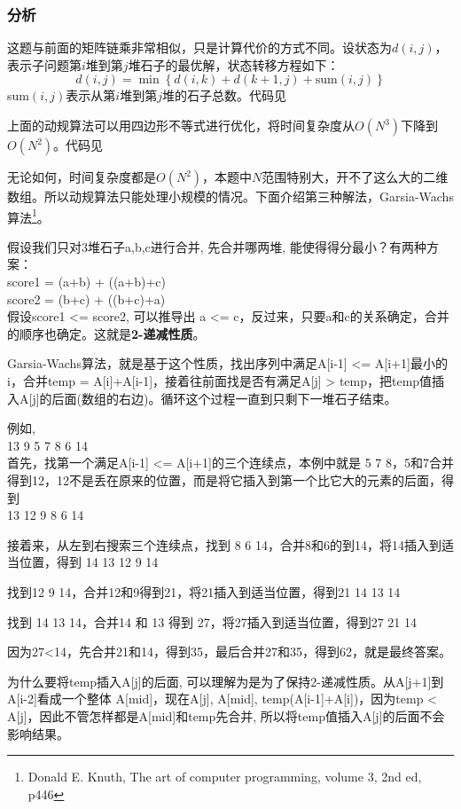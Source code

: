 \subsubsection{分析}
这题与前面的矩阵链乘非常相似，只是计算代价的方式不同。设状态为$d(i,j)$，表示子问题第$i$堆到第$j$堆石子的最优解，状态转移方程如下：
$$d(i,j)=\min\left\{d(i,k)+d(k+1,j) + \text{sum}(i,j)\right\}$$
sum$(i,j)$表示从第$i$堆到第$j$堆的石子总数。代码见

上面的动规算法可以用四边形不等式进行优化，将时间复杂度从$O(N^3)$下降到$O(N^2)$。代码见

无论如何，时间复杂度都是$O(N^2)$，本题中$N$范围特别大，开不了这么大的二维数组。所以动规算法只能处理小规模的情况。下面介绍第三种解法，Garsia-Wachs算法\footnote{Donald E. Knuth, The art of computer programming, volume 3, 2nd ed, p446}。

假设我们只对3堆石子a,b,c进行合并, 先合并哪两堆, 能使得得分最小？有两种方案：\\
score1 = (a+b) + ((a+b)+c)\\
score2 = (b+c) + ((b+c)+a)\\
假设score1 <= score2, 可以推导出 a <= c，反过来，只要a和c的关系确定，合并的顺序也确定。这就是\textbf{2-递减性质}。

Garsia-Wachs算法，就是基于这个性质，找出序列中满足A[i-1] <= A[i+1]最小的i，合并temp = A[i]+A[i-1]，接着往前面找是否有满足A[j] > temp，把temp值插入A[j]的后面(数组的右边)。循环这个过程一直到只剩下一堆石子结束。

例如,\\
13 9 5 7 8 6 14\\
首先，找第一个满足A[i-1] <= A[i+1]的三个连续点，本例中就是 5 7 8，5和7合并得到12，12不是丢在原来的位置，而是将它插入到第一个比它大的元素的后面，得到\\
13 12 9 8 6 14

接着来，从左到右搜索三个连续点，找到 8 6 14，合并8和6的到14，将14插入到适当位置，得到 14 13 12 9 14

找到12 9 14，合并12和9得到21，将21插入到适当位置，得到21 14 13 14

找到 14 13 14，合并14 和 13 得到 27，将27插入到适当位置，得到27 21 14

因为27<14，先合并21和14，得到35，最后合并27和35，得到62，就是最终答案。

为什么要将temp插入A[j]的后面, 可以理解为是为了保持2-递减性质。从A[j+1]到A[i-2]看成一个整体 A[mid]，现在A[j], A[mid], temp(A[i-1]+A[i])，因为temp < A[j]，因此不管怎样都是A[mid]和temp先合并, 所以将temp值插入A[j]的后面不会影响结果。


